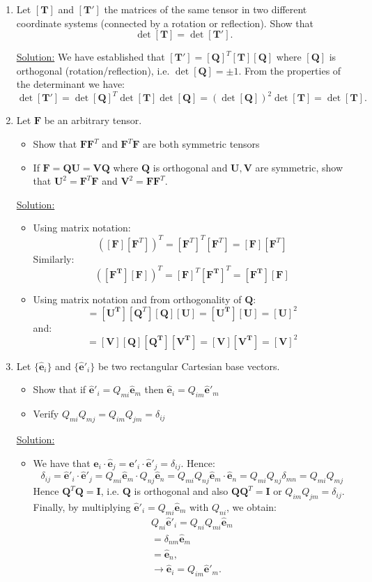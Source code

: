\documentclass{article}
\newcommand{\ee}{\end{equation}}
\newcommand{\be}{\begin{equation}}
\newcommand{\bi}{\begin{itemize}}
\newcommand{\ei}{\end{itemize}}
\newcommand{\bs}{\boldsymbol}
\begin{document}
\begin{enumerate}
\item  Let $[\bs{T}]$ and $[\bs{T}']$ the matrices of the same tensor in two different coordinate systems (connected by a rotation or reflection). Show that
\be
\det[\bs{T}]=\det[\bs{T}'].
\ee
%

\underline{Solution:}
We have established that $[\bs{T}']=[\bs{Q}]^T[\bs{T}][\bs{Q}]$ where $[\bs{Q}]$ is orthogonal (rotation/reflection), i.e. $\det[\bs{Q}]=\pm 1$. From the
properties of the determinant we have:
\be
\det [\bs{T}']=\det[\bs{Q}]^T \det[\bs{T}]\det[\bs{Q}] =(\det[\bs{Q}])^2 \det[\bs{T}]=\det[\bs{T}].
\ee
%

\item  Let $\bs{F}$ be an arbitrary tensor.
\bi
\item Show that $\bs{F}\bs{F}^T$ and $\bs{F}^T\bs{F}$ are both symmetric tensors
\item  If $\bs{F}=\bs{QU}=\bs{VQ}$ where $\bs{Q}$ is orthogonal and $\bs{U,V}$ are symmetric, show that $\bs{U}^2=\bs{F}^T\bs{F}$ and $\bs{V}^2=\bs{F}\bs{F}^T$.
\ei

\underline{Solution:}
\bi
\item Using matrix notation:
\be 
\left([\bs{F}][\bs{F}^T]\right)^T=[\bs{F}^T]^T[\bs{F}^T]=[\bs{F}][\bs{F}^T]
\ee
Similarly:
\be
\left([\bs{F^T}][\bs{F}]\right)^T=[\bs{F}]^T[\bs{F^T}]^T=[\bs{F^T}][\bs{F}]
\ee

\item Using matrix notation and from orthogonality of $\bs{Q}$:
\be
[\bs{F^T}][\bs{F}]=[\bs{U^T}][\bs{Q}^T][\bs{Q}][\bs{U}]=[\bs{U^T}][\bs{U}]=[\bs{U}]^2
\ee
and:
\be 
[\bs{F}][\bs{F^T}]=[\bs{V}][\bs{Q}][\bs{Q^T}][\bs{V^T}]=[\bs{V}][\bs{V^T}]=[\bs{V}]^2
\ee

\ei


\item  Let $\{\bs{\hat{e}}_i\}$  and $\{\bs{\hat{e}}'_i\}$   be two rectangular Cartesian base vectors. 
\bi
\item  Show that if $\bs{\hat{e}}'_i=Q_{mi}\bs{\hat{e}}_m$ then $\bs{\hat{e}}_i=Q_{im}\bs{\hat{e}}'_m$
\item  Verify $Q_{mi}Q_{mj}=Q_{im}Q_{jm}=\delta_{ij}$
\ei

\underline{Solution:}

\bi
\item We have that $\bs{\hat{e}}_i \cdot \bs{\hat{e}}_j=\bs{\hat{e}}'_i \cdot \bs{\hat{e}}'_j=\delta_{ij}$. 
Hence:
\be
\delta_{ij}=\bs{\hat{e}}'_i \cdot \bs{\hat{e}}'_j=Q_{mi}\bs{\hat{e}}_m \cdot Q_{nj}\bs{\hat{e}}_n=Q_{mi}Q_{nj} \bs{\hat{e}}_m \cdot \bs{\hat{e}}_n =
Q_{mi}Q_{nj}\delta_{mn}=Q_{mi}Q_{mj}
\ee
Hence $\bs{Q}^T\bs{Q}=\bs{I}$, i.e. $\bs{Q}$ is orthogonal and also $\bs{Q}\bs{Q}^T=\bs{I}$ or $Q_{im}Q_{jm}=\delta_{ij}$.
Finally, by multiplying $\bs{\hat{e}}'_i=Q_{mi}\bs{\hat{e}}_m$ with $Q_{ni}$, we obtain:
\be
\begin{array}{l}
Q_{ni} \bs{\hat{e}}'_i=Q_{ni} Q_{mi}\bs{\hat{e}}_m \\
=\delta_{nm} \bs{\hat{e}}_m \\
=\bs{\hat{e}}_n, \\
\to \bs{\hat{e}}_i=Q_{im} \bs{\hat{e}}'_m.
\end{array}
\ee

\ei

\end{enumerate}
\end{document}
